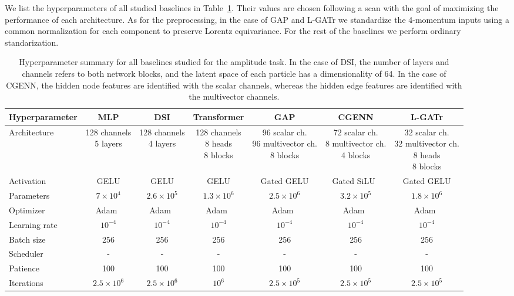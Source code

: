 \documentclass[submission, Phys]{SciPost}
\begin{document}
We list the hyperparameters of all studied baselines in Table~\ref{tab:amp_build}. Their values are chosen following a scan with the goal of maximizing the performance of each architecture. As for the preprocessing, in the case of GAP and L-GATr we standardize the 4-momentum inputs using a common normalization for each component to preserve Lorentz equivariance. For the rest of the baselines we perform ordinary standarization.

\begin{table}[b!]
\fontsize{7}{7}\selectfont
    \centering
    \begin{tabular}{l cccccc}
        \toprule
        Hyperparameter & MLP & DSI & Transformer & GAP & CGENN & L-GATr \\[1mm]
        \midrule
        Architecture & \makecell{128 channels \\ 5 layers} & \makecell{128 channels \\ 4 layers} & \makecell{128 channels \\ 8 heads \\ 8 blocks} & \makecell{96 scalar ch. \\ 96 multivector ch. \\ 8 blocks} & \makecell{72 scalar ch. \\ 8 multivector ch. \\ 4 blocks} & \makecell{32 scalar ch. \\ 32 multivector ch. \\ 8 heads \\ 8 blocks} \\
        Activation & GELU & GELU & GELU & Gated GELU & Gated SiLU~\cite{ruhe2023clifford} & Gated GELU \\
        Parameters & $7 \times 10^4$ & $2.6 \times 10^5$ & $1.3 \times 10^6$ & $2.5 \times 10^6$ & $3.2 \times 10^5$ & $1.8 \times 10^6$ \\
        \midrule        
        Optimizer & Adam~\cite{adam} & Adam~\cite{adam} & Adam~\cite{adam} & Adam~\cite{adam} & Adam~\cite{adam} & Adam~\cite{adam} \\
        Learning rate & $10^{-4}$ & $10^{-4}$ & $10^{-4}$ & $10^{-4}$ & $10^{-4}$ & $10^{-4}$ \\
        Batch size & 256 & 256 & 256 & 256 & 256 & 256  \\
        Scheduler & - & - & - & - & - & -  \\
        Patience & 100 & 100 & 100 & 100 & 100 & 100
        \\        
        Iterations & $2.5 \times 10^6$ & $2.5 \times 10^6$ & $10^6$ & $2.5 \times 10^5$ & $2.5 \times 10^5$ & $2.5 \times 10^5$
        \\
        \bottomrule
    \end{tabular} 
    \caption{Hyperparameter summary for all baselines studied for the amplitude task. In the case of DSI, the number of layers and channels refers to both network blocks, and the latent space of each particle has a dimensionality of 64. In the case of CGENN, the hidden node features are identified with the scalar channels, whereas the hidden edge features are identified with the multivector channels. } 
    \label{tab:amp_build}
\end{table}
\end{document}
